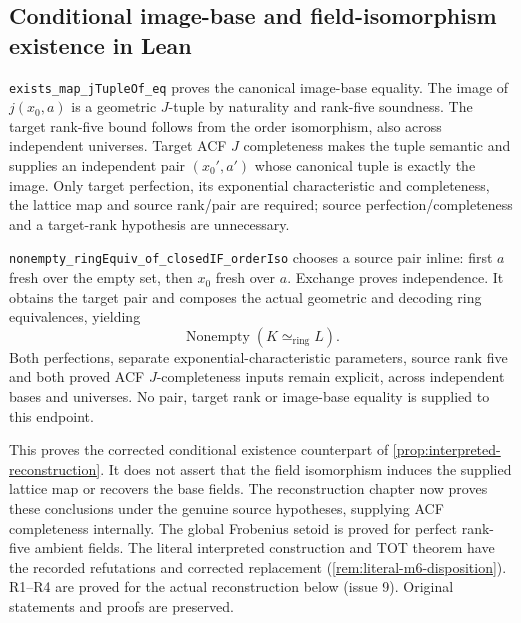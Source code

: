 \documentclass[11pt,oneside]{article}
\theoremstyle{definition}
\theoremstyle{remark}
\newcommand{\lean}[1]{\nolinkurl{#1}}
\begin{document}
\subsection{Conditional image-base and field-isomorphism existence in Lean}

\lean{exists_map_jTupleOf_eq} proves the canonical image-base equality. The image of
$j(x_0,a)$ is a geometric $J$-tuple by naturality and rank-five soundness. The target
rank-five bound follows from the order isomorphism, also across independent universes.
Target ACF $J$ completeness makes the tuple semantic and supplies an independent
pair $(x_0',a')$ whose canonical tuple is exactly the image. Only target perfection,
its exponential characteristic and completeness, the lattice map and source rank/pair
are required; source perfection/completeness and a target-rank hypothesis are unnecessary.

\lean{nonempty_ringEquiv_of_closedIF_orderIso} chooses a source pair inline: first
$a$ fresh over the empty set, then $x_0$ fresh over $a$. Exchange proves independence.
It obtains the target pair and composes the actual geometric and decoding ring
equivalences, yielding
\[
 \operatorname{Nonempty}(K\simeq_{\mathrm{ring}}L).
\]
Both perfections, separate exponential-characteristic parameters, source rank five and
both proved ACF $J$-completeness inputs remain explicit, across independent bases
and universes. No pair, target rank or image-base equality is supplied to this endpoint.

This proves the corrected conditional existence counterpart of
\cref{prop:interpreted-reconstruction}. It does not assert that the field isomorphism
induces the supplied lattice map or recovers the base fields. The reconstruction chapter
now proves these conclusions under the genuine source hypotheses, supplying ACF
completeness internally. The global Frobenius setoid is proved for perfect rank-five
ambient fields. The literal interpreted construction and TOT theorem have the recorded
refutations and corrected replacement (\cref{rem:literal-m6-disposition}). R1--R4 are proved for
the actual reconstruction below (issue 9).
Original statements and proofs are preserved.
\end{document}
